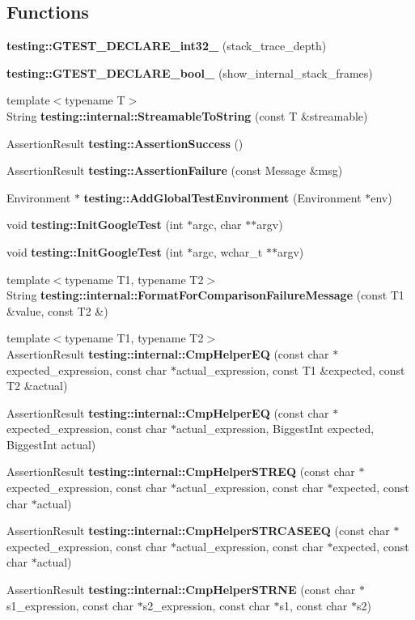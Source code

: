 \subsection*{Functions}
\begin{CompactItemize}
\item 
{\bf testing::GTEST\_\-DECLARE\_\-int32\_\-} (stack\_\-trace\_\-depth)
\item 
{\bf testing::GTEST\_\-DECLARE\_\-bool\_\-} (show\_\-internal\_\-stack\_\-frames)
\item 
{\footnotesize template$<$typename T$>$ }\\String {\bf testing::internal::StreamableToString} (const T \&streamable)
\item 
AssertionResult {\bf testing::AssertionSuccess} ()
\item 
AssertionResult {\bf testing::AssertionFailure} (const Message \&msg)
\item 
Environment $\ast$ {\bf testing::AddGlobalTestEnvironment} (Environment $\ast$env)
\item 
void {\bf testing::InitGoogleTest} (int $\ast$argc, char $\ast$$\ast$argv)
\item 
void {\bf testing::InitGoogleTest} (int $\ast$argc, wchar\_\-t $\ast$$\ast$argv)
\item 
{\footnotesize template$<$typename T1, typename T2$>$ }\\String {\bf testing::internal::FormatForComparisonFailureMessage} (const T1 \&value, const T2 \&)
\item 
{\footnotesize template$<$typename T1, typename T2$>$ }\\AssertionResult {\bf testing::internal::CmpHelperEQ} (const char $\ast$expected\_\-expression, const char $\ast$actual\_\-expression, const T1 \&expected, const T2 \&actual)
\item 
AssertionResult {\bf testing::internal::CmpHelperEQ} (const char $\ast$expected\_\-expression, const char $\ast$actual\_\-expression, BiggestInt expected, BiggestInt actual)
\item 
AssertionResult {\bf testing::internal::CmpHelperSTREQ} (const char $\ast$expected\_\-expression, const char $\ast$actual\_\-expression, const char $\ast$expected, const char $\ast$actual)
\item 
AssertionResult {\bf testing::internal::CmpHelperSTRCASEEQ} (const char $\ast$expected\_\-expression, const char $\ast$actual\_\-expression, const char $\ast$expected, const char $\ast$actual)
\item 
AssertionResult {\bf testing::internal::CmpHelperSTRNE} (const char $\ast$s1\_\-expression, const char $\ast$s2\_\-expression, const char $\ast$s1, const char $\ast$s2)

\end{CompactItemize}
